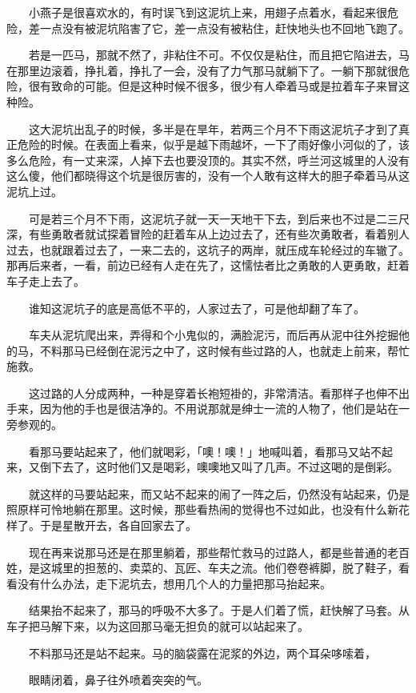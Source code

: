 \documentclass[UTF8]{ctexart}
\begin{document}
　　小燕子是很喜欢水的，有时误飞到这泥坑上来，用翅子点着水，看起来很危险，差一点没有被泥坑陷害了它，差一点没有被粘住，赶快地头也不回地飞跑了。

　　若是一匹马，那就不然了，非粘住不可。不仅仅是粘住，而且把它陷进去，马在那里边滚着，挣扎着，挣扎了一会，没有了力气那马就躺下了。一躺下那就很危险，很有致命的可能。但是这种时候不很多，很少有人牵着马或是拉着车子来冒这种险。

　　这大泥坑出乱子的时候，多半是在旱年，若两三个月不下雨这泥坑子才到了真正危险的时候。在表面上看来，似乎是越下雨越坏，一下了雨好像小河似的了，该多么危险，有一丈来深，人掉下去也要没顶的。其实不然，呼兰河这城里的人没有这么傻，他们都晓得这个坑是很厉害的，没有一个人敢有这样大的胆子牵着马从这泥坑上过。

　　可是若三个月不下雨，这泥坑子就一天一天地干下去，到后来也不过是二三尺深，有些勇敢者就试探着冒险的赶着车从上边过去了，还有些次勇敢者，看着别人过去，也就跟着过去了，一来二去的，这坑子的两岸，就压成车轮经过的车辙了。那再后来者，一看，前边已经有人走在先了，这懦怯者比之勇敢的人更勇敢，赶着车子走上去了。

　　谁知这泥坑子的底是高低不平的，人家过去了，可是他却翻了车了。

　　车夫从泥坑爬出来，弄得和个小鬼似的，满脸泥污，而后再从泥中往外挖掘他的马，不料那马已经倒在泥污之中了，这时候有些过路的人，也就走上前来，帮忙施救。

　　这过路的人分成两种，一种是穿着长袍短褂的，非常清洁。看那样子也伸不出手来，因为他的手也是很洁净的。不用说那就是绅士一流的人物了，他们是站在一旁参观的。

　　看那马要站起来了，他们就喝彩，「噢！噢！」地喊叫着，看那马又站不起来，又倒下去了，这时他们又是喝彩，噢噢地又叫了几声。不过这喝的是倒彩。

　　就这样的马要站起来，而又站不起来的闹了一阵之后，仍然没有站起来，仍是照原样可怜地躺在那里。这时候，那些看热闹的觉得也不过如此，也没有什么新花样了。于是星散开去，各自回家去了。

　　现在再来说那马还是在那里躺着，那些帮忙救马的过路人，都是些普通的老百姓，是这城里的担葱的、卖菜的、瓦匠、车夫之流。他们卷卷裤脚，脱了鞋子，看看没有什么办法，走下泥坑去，想用几个人的力量把那马抬起来。

　　结果抬不起来了，那马的呼吸不大多了。于是人们着了慌，赶快解了马套。从车子把马解下来，以为这回那马毫无担负的就可以站起来了。

　　不料那马还是站不起来。马的脑袋露在泥浆的外边，两个耳朵哆嗦着，

　　眼睛闭着，鼻子往外喷着突突的气。
\end{document}
